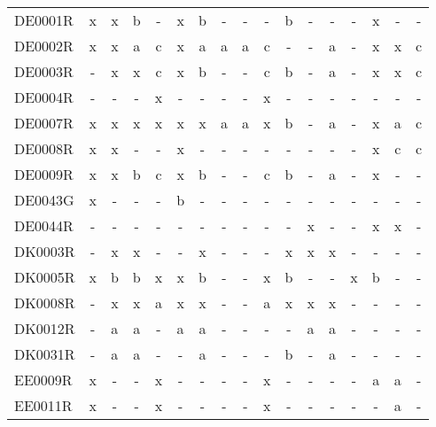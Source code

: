 \begin{table}
{{\begin{tabular}{l|cccccccccccccccc}
        DE0001R &  x &   x &    b &      - &   x &    b &    - &    - &      - &    b &    - &   - &      - &    x &    - &     - \\
        DE0002R &  x &   x &    a &      c &   x &    a &    a &    a &      c &    - &    - &   a &      - &    x &    x &     c \\
        DE0003R &  - &   x &    x &      c &   x &    b &    - &    - &      c &    b &    - &   a &      - &    x &    x &     c \\
        DE0004R &  - &   - &    - &      x &   - &    - &    - &    - &      x &    - &    - &   - &      - &    - &    - &     - \\
        DE0007R &  x &   x &    x &      x &   x &    x &    a &    a &      x &    b &    - &   a &      - &    x &    a &     c \\
        DE0008R &  x &   x &    - &      - &   x &    - &    - &    - &      - &    - &    - &   - &      - &    x &    c &     c \\
        DE0009R &  x &   x &    b &      c &   x &    b &    - &    - &      c &    b &    - &   a &      - &    x &    - &     - \\
        DE0043G &  x &   - &    - &      - &   b &    - &    - &    - &      - &    - &    - &   - &      - &    - &    - &     - \\
        DE0044R &  - &   - &    - &      - &   - &    - &    - &    - &      - &    - &    x &   - &      - &    x &    x &     - \\
        DK0003R &  - &   x &    x &      - &   - &    x &    - &    - &      - &    x &    x &   x &      - &    - &    - &     - \\
        DK0005R &  x &   b &    b &      x &   x &    b &    - &    - &      x &    b &    - &   - &      x &    b &    - &     - \\
        DK0008R &  - &   x &    x &      a &   x &    x &    - &    - &      a &    x &    x &   x &      - &    - &    - &     - \\
        DK0012R &  - &   a &    a &      - &   a &    a &    - &    - &      - &    - &    a &   a &      - &    - &    - &     - \\
        DK0031R &  - &   a &    a &      - &   - &    a &    - &    - &      - &    b &    - &   a &      - &    - &    - &     - \\
        EE0009R &  x &   - &    - &      x &   - &    - &    - &    - &      x &    - &    - &   - &      - &    a &    a &     - \\
        EE0011R &  x &   - &    - &      x &   - &    - &    - &    - &      x &    - &    - &   - &      - &    - &    a &     - \\

\end{tabular}}}
\end{table}
